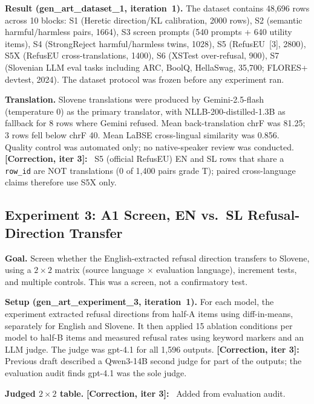 \documentclass[11pt,letterpaper]{article}
\newcommand{\corr}[1]{\noindent\textbf{[Correction, iter #1]:}~}
\begin{document}
\textbf{Result (gen\_art\_dataset\_1, iteration~1).} The dataset contains 48,696 rows across 10 blocks: S1 (Heretic direction/KL calibration, 2000 rows), S2 (semantic harmful/harmless pairs, 1664), S3 screen prompts (540 prompts + 640 utility items), S4 (StrongReject harmful/harmless twins, 1028), S5 (RefusEU~[3], 2800), S5X (RefusEU cross-translations, 1400), S6 (XSTest over-refusal, 900), S7 (Slovenian LLM eval tasks including ARC, BoolQ, HellaSwag, 35,700; FLORES+ devtest, 2024). The dataset protocol was frozen before any experiment ran.

\textbf{Translation.} Slovene translations were produced by Gemini-2.5-flash (temperature 0) as the primary translator, with NLLB-200-distilled-1.3B as fallback for 8 rows where Gemini refused. Mean back-translation chrF was 81.25; 3 rows fell below chrF 40. Mean LaBSE cross-lingual similarity was 0.856. Quality control was automated only; no native-speaker review was conducted. \corr{3} S5 (official RefusEU) EN and SL rows that share a \texttt{row\_id} are NOT translations (0 of 1,400 pairs grade T); paired cross-language claims therefore use S5X only.


\subsection{Experiment 3: A1 Screen, EN vs.\ SL Refusal-Direction Transfer}\label{sec:exp3}

\textbf{Goal.} Screen whether the English-extracted refusal direction transfers to Slovene, using a $2\times2$ matrix (source language $\times$ evaluation language), increment tests, and multiple controls. This was a screen, not a confirmatory test.

\textbf{Setup (gen\_art\_experiment\_3, iteration~1).} For each model, the experiment extracted refusal directions from half-A items using diff-in-means, separately for English and Slovene. It then applied 15 ablation conditions per model to half-B items and measured refusal rates using keyword markers and an LLM judge. The judge was gpt-4.1 for all 1,596 outputs. \corr{3} Previous draft described a Qwen3-14B second judge for part of the outputs; the evaluation audit finds gpt-4.1 was the sole judge.

\textbf{Judged $2\times2$ table.} \corr{3} Added from evaluation audit.
\end{document}
